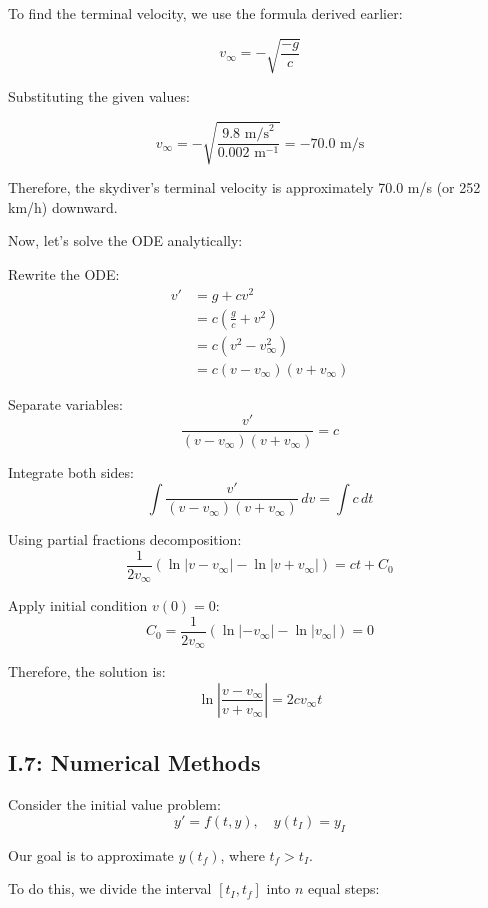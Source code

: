 \documentclass{article}
\begin{document}
To find the terminal velocity, we use the formula derived earlier:

\[
v_\infty = -\sqrt{\frac{-g}{c}}
\]


Substituting the given values:

\[
v_\infty = -\sqrt{\frac{9.8\text{ m/s}^2}{0.002\text{ m}^{-1}}} = -70.0\text{ m/s}
\]

Therefore, the skydiver's terminal velocity is approximately 70.0 m/s (or 252 km/h) downward.

Now, let's solve the ODE analytically:

Rewrite the ODE:
\begin{align*}
v' &= g + cv^2 \\
   &= c\left(\frac{g}{c} + v^2\right) \\
   &= c(v^2 - v_\infty^2) \\
   &= c(v - v_\infty)(v + v_\infty)
\end{align*}

Separate variables:
\[
\frac{v'}{(v - v_\infty)(v + v_\infty)} = c
\]

Integrate both sides:
\[
\int \frac{v'}{(v - v_\infty)(v + v_\infty)} \, dv = \int c \, dt
\]

Using partial fractions decomposition:
\[
\frac{1}{2v_\infty}\left(\ln|v - v_\infty| - \ln|v + v_\infty|\right) = ct + C_0
\]

Apply initial condition $v(0) = 0$:
\[
C_0 = \frac{1}{2v_\infty}\left(\ln|-v_\infty| - \ln|v_\infty|\right) = 0
\]

Therefore, the solution is:
\[
\ln\left|\frac{v - v_\infty}{v + v_\infty}\right| = 2cv_\infty t
\]


\subsection{I.7: Numerical Methods}

Consider the initial value problem:
\[
y' = f(t, y), \quad y(t_I) = y_I
\]

Our goal is to approximate $y(t_f)$, where $t_f > t_I$.

To do this, we divide the interval $[t_I, t_f]$ into $n$ equal steps:

\begin{center}
\end{center}
\end{document}
